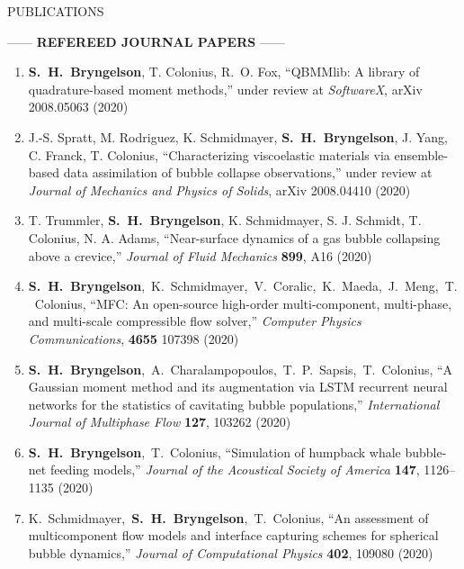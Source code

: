 \documentclass{resume} %
\makeatletter
\newlength{\bibhang}
\newlength{\bibsep}
\newenvironment{bibsection}%
        {\begin{enumerate}{}{%
       \setlength{\leftmargin}{\bibhang}%
       \setlength{\itemindent}{-\leftmargin}%
       \setlength{\itemsep}{\bibsep}%
       \setlength{\parsep}{\z@}%
        \setlength{\topsep}{0pt}}}
        {\end{enumerate}\vspace{-.1\baselineskip}}
\newcommand\SHB{\mbox{\textbf{S. H. Bryngelson}}}
\newcommand\SpencerTim{\mbox{\textbf{S. H. Bryngelson}, T. Colonius}}
\newcommand\KevinSpencerTim{\mbox{K. Schmidmayer, \textbf{S. H. Bryngelson}, T. Colonius}}
\newcommand\SpencerThemis{\mbox{\textbf{S. H. Bryngelson}, A. Charalampopoulos, T. P. Sapsis, T. Colonius}}
\newcommand{\CPC}{Computer Physics Communications}
\newcommand{\JASA}{Journal of the Acoustical Society of America}
\newcommand{\JCP}{Journal of Computational Physics}
\newcommand{\IJMF}{International Journal of Multiphase Flow}
\newcommand{\JFM}{Journal of Fluid Mechanics}
\makeatother
\begin{document}
\begin{rSection}{{\Large P}UBLICATIONS} %

\smallskip

\sloppy

\begin{center}
    ------ \textbf{REFEREED JOURNAL PAPERS} ------
\end{center}

\begin{bibsection}
    \setlength{\itemsep}{\bibsep}%

   \item \SHB, T. Colonius, R.\ O. Fox, 
    ``QBMMlib: A library of quadrature-based moment methods,''
    under review at \emph{SoftwareX}, arXiv 2008.05063 (2020)

    \item J.-S. Spratt, M. Rodriguez, K. Schmidmayer, \SHB, J. Yang, C. Franck, T. Colonius, 
    ``Characterizing viscoelastic materials via ensemble-based data assimilation of bubble collapse observations,''
    under review at \emph{Journal of Mechanics and Physics of Solids}, arXiv 2008.04410 (2020)

    \item T. Trummler, \SHB, K. Schmidmayer, S. J. Schmidt, T. Colonius, N. A. Adams,
    ``Near\hyp{}surface dynamics of a gas bubble collapsing above a crevice,''
	\emph{\JFM} \textbf{899}, A16 (2020) 

    \item \mbox{\textbf{S. H. Bryngelson}, K. Schmidmayer, V. Coralic, K. Maeda, J. Meng, T. Colonius}, 
    ``MFC: An open\hyp{}source high\hyp{}order multi-component, multi-phase, and multi-scale compressible flow solver,''
    \emph{\CPC}, \textbf{4655} 107398 (2020)

    \item \SpencerThemis,
	``A Gaussian moment method and its augmentation via LSTM recurrent neural networks for the statistics of cavitating bubble populations,''
    \emph{\IJMF} \textbf{127}, 103262 (2020)

	\item \SpencerTim, 
	``Simulation of humpback whale bubble-net feeding models,'' 
    \emph{\JASA} \textbf{147}, 1126--1135 (2020) 	

	\item \KevinSpencerTim, 
	``An assessment of multicomponent flow models and interface capturing schemes for spherical bubble dynamics,''
    \emph{\JCP} \textbf{402}, 109080 (2020) 


\end{bibsection}
\end{rSection}
\end{document}
